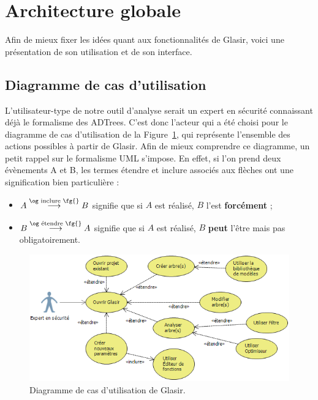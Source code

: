 \section{Architecture globale}
    \label{sec:archiGlobale}
    
    Afin de mieux fixer les idées quant aux fonctionnalités de Glasir, voici une présentation de son utilisation et de son interface.
	    
    \subsection{Diagramme de cas d'utilisation}
    \label{sec:casutil}
    
    L'utilisateur-type de notre outil d'analyse serait un expert en sécurité connaissant déjà le formalisme des ADTrees. C'est donc l'acteur qui a été choisi pour le diagramme de cas d'utilisation de la {\sc Figure}~\ref{fig:use_case}, qui représente l'ensemble des actions possibles à partir de Glasir. Afin de mieux comprendre ce diagramme, un petit rappel sur le formalisme UML s'impose. En effet, si l'on prend deux évènements A et B, les termes \og étendre \fg{} et \og inclure \fg{} associés aux flèches ont une signification bien particulière :

    \begin{itemize}
    \item[] $ A \stackrel{\text{\og inclure \fg{}}}{\longrightarrow} B$ signifie que si $A$ est réalisé, $B$ l'est {\bf forcément} ;
    \item[] $ B \stackrel{\text{\og étendre \fg{}}}{\longrightarrow} A$ signifie que si $A$ est réalisé, $B$ {\bf peut} l'être mais pas obligatoirement.
    \end{itemize}

    \begin{figure}[H]
        \centering
        \includegraphics[width=\textwidth]{figure/UseCaseDiagram.png}
        \caption{Diagramme de cas d'utilisation de Glasir.}
        \label{fig:use_case}
    \end{figure}

